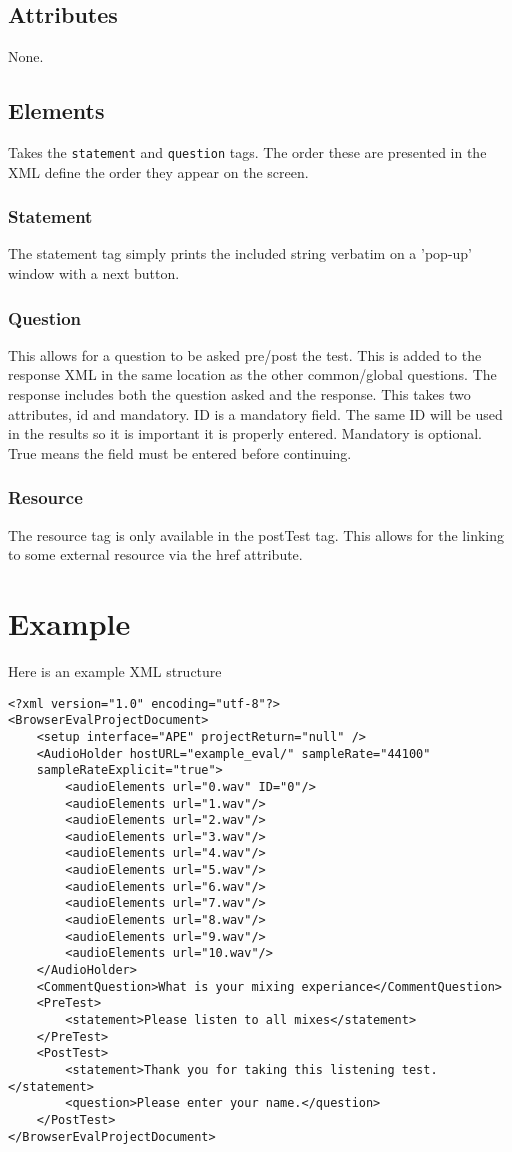 \documentclass{article}
\begin{document}
\subsection{Attributes}
None.

\subsection{Elements}
Takes the \texttt{statement} and \texttt{question} tags. The order these are presented in the XML define the order they appear on the screen.

\subsubsection{Statement}

The statement tag simply prints the included string verbatim on a 'pop-up' window with a next button.

\subsubsection{Question}

This allows for a question to be asked pre/post the test. This is added to the response XML in the same location as the other common/global questions. The response includes both the question asked and the response. This takes two attributes, id and mandatory. ID is a mandatory field. The same ID will be used in the results so it is important it is properly entered. Mandatory is optional. True means the field must be entered before continuing.

\subsubsection{Resource}

The resource tag is only available in the postTest tag. This allows for the linking to some external resource via the href attribute.

\section{Example}

Here is an example XML structure

\begin{lstlisting}
<?xml version="1.0" encoding="utf-8"?>
<BrowserEvalProjectDocument>
	<setup interface="APE" projectReturn="null" />
	<AudioHolder hostURL="example_eval/" sampleRate="44100"
	sampleRateExplicit="true">
		<audioElements url="0.wav" ID="0"/>
		<audioElements url="1.wav"/>
		<audioElements url="2.wav"/>
		<audioElements url="3.wav"/>
		<audioElements url="4.wav"/>
		<audioElements url="5.wav"/>
		<audioElements url="6.wav"/>
		<audioElements url="7.wav"/>
		<audioElements url="8.wav"/>
		<audioElements url="9.wav"/>
		<audioElements url="10.wav"/>
	</AudioHolder>
	<CommentQuestion>What is your mixing experiance</CommentQuestion>
	<PreTest>
		<statement>Please listen to all mixes</statement>
	</PreTest>
	<PostTest>
		<statement>Thank you for taking this listening test.</statement>
		<question>Please enter your name.</question>
	</PostTest>
</BrowserEvalProjectDocument>
\end{lstlisting}
\end{document}
